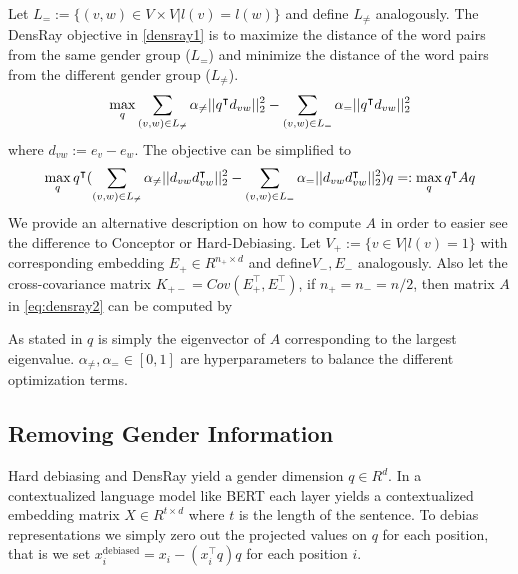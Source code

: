 Let $L_{=}:=\{(v,w)\in V\times V|l(v)=l(w)\}$ and define
$L_{\neq}$ analogously.  The DensRay objective
in \eqref{densray1} is to maximize the distance of the word
pairs from the same gender group ($L_{=}$) and minimize the
distance of the word pairs from the different gender group
($L_{\neq}$).
\begin{eqnarray}
\max\limits_{q} 
\sum_{(v,w)\in L_{\neq}}\alpha_{\neq}||q^\intercal d_{vw}||^2_2
-\sum_{(v,w)\in L_{=}}\alpha_{=}||q^\intercal d_{vw}||^2_2
\eqlabel{densray1}
\end{eqnarray}
where $d_{vw}:=e_v-e_w$. The objective can be simplified to 
\begin{eqnarray}
\max \limits_{q} q^\intercal(
\sum_{(v,w)\in L_{\neq}}\alpha_{\neq}||d_{vw}d_{vw}^\intercal ||^2_2-\sum_{(v,w)\in L_{=}}\alpha_{=}||d_{vw}d_{vw}^\intercal ||^2_2)q=:\max\limits_{q} q^\intercal Aq
\eqlabel{eq:densray2}
\end{eqnarray}
We provide an alternative description on how to compute $A$ in order to easier see the difference to Conceptor or Hard-Debiasing.
Let $V_{+}:=\{v\in V|l(v)=1\}$ with corresponding embedding $E_{+} \in R^{n_+\times d}$ and define$V_{-}, E_{-}$ analogously. Also let the cross-covariance matrix $K_{+-}=Cov(E_{+}^\intercal,E_{-}^\intercal)$, if $n_{+}=n_{-}=n/2$, then matrix $A$ in \eqref{eq:densray2} can be computed by

As stated in \cite{dufter2019analytical} $q$ is simply the eigenvector of $A$ corresponding to the largest eigenvalue.
$\alpha_{\neq},\alpha_{=}\in [0,1]$ are hyperparameters to balance the different optimization terms. 



\subsection{Removing Gender Information}

Hard debiasing and DensRay yield a gender dimension $q \in R^d$. In a contextualized language model like BERT each layer yields a contextualized embedding matrix $X \in R^{t \times d}$ where $t$ is the length of the sentence. To debias representations we simply zero out the projected values on $q$ for each position, that is we set $x^{\text{debiased}}_i = x_i -  (x_i^\intercal q) q$ for each position $i$.


